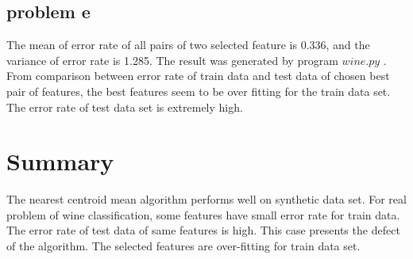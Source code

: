 \documentclass{article}
\begin{document}
	\subsection{problem e}
	The mean of error rate of all pairs of two selected feature is 0.336, and the variance of error rate is 1.285.  The result was generated by program $wine.py$ .
	From comparison between error rate of train data and test data of chosen best pair of features, the best features seem to be over fitting for the train data set. The error rate of test data set is extremely high. 
	\section{Summary}
	The nearest centroid mean algorithm performs well on synthetic data set. For real problem of wine classification, some features have small error rate for train data. The error rate of test data of same features is high. This case presents the defect of the algorithm. The selected features are over-fitting for train data set. 
\end{document}
